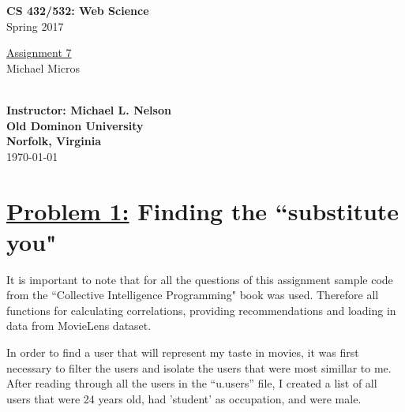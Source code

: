 \documentclass{article}
\begin{document}

\begin{titlepage}

\vspace*{45 pt}
\begin{center}
\Huge{\bf CS 432/532:  Web Science}\\
\huge{Spring 2017\\}

\vspace{60 pt}
\Huge\underline {Assignment 7}\\

\vspace{10 pt}
\Huge{Michael Micros}\\\

{\Large \bf {Instructor: Michael L. Nelson}}\\

\vspace{230 pt}
{\huge \bf {Old Dominon University}}\\
{\huge \bf {Norfolk, Virginia}}\\

\vspace{10 pt}
\today

\end{center}
\end{titlepage}





\section*{{\underline{\huge {Problem 1:}}  Finding the ``substitute you"}}
It is important to note that for all the questions of this assignment  sample code from the ``Collective Intelligence Programming" book was used. Therefore all functions for calculating correlations, providing recommendations and loading in data from MovieLens dataset.

In order to find a user that will represent my taste in movies, it was first necessary to filter the users and isolate the users that were most simillar to me. After reading through all the users in the ``u.users'' file, I created a list of all users that were 24 years old, had 'student' as occupation, and were male.
\end{document}
